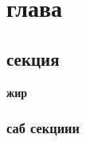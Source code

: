 \chapter{ глава } \label{chapt1}


\section{ секция} \label{sect1_1}

\textbf{жир} 

\subsection{саб секциии} \label{subsect1_1_1}




\clearpage